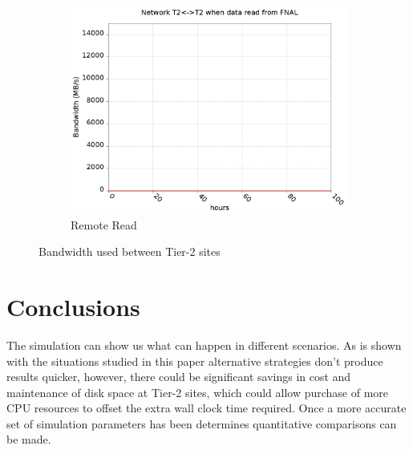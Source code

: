 \documentclass[a4paper]{jpconf}
\begin{document}
\begin{figure}
\begin{subfigure}{0.3\textwidth}
    \includegraphics[width=\textwidth]{figures/F_FP0_RP0DataT2.png}
    \caption{Remote Read\label{fig:tier2Remote}}
  \end{subfigure}
  \caption{Bandwidth used between Tier-2 sites\label{fig:tier2}}
\end{figure}

\section{Conclusions}

The simulation can show us what can happen in different scenarios. As
is shown with the situations studied in this paper alternative
strategies don't produce results quicker, however, there could be
significant savings in cost and maintenance of disk space at Tier-2
sites, which could allow purchase of more CPU resources to offset the
extra wall clock time required. Once a more accurate set of simulation
parameters has been determines quantitative comparisons can be made.
\end{document}

